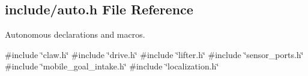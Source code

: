 \subsection{include/auto.h File Reference}
\label{auto_8h}


Autonomous declarations and macros.  


{\ttfamily \#include \char`\"{}claw.\+h\char`\"{}}\newline
{\ttfamily \#include \char`\"{}drive.\+h\char`\"{}}\newline
{\ttfamily \#include \char`\"{}lifter.\+h\char`\"{}}\newline
{\ttfamily \#include \char`\"{}sensor\+\_\+ports.\+h\char`\"{}}\newline
{\ttfamily \#include \char`\"{}mobile\+\_\+goal\+\_\+intake.\+h\char`\"{}}\newline
{\ttfamily \#include \char`\"{}localization.\+h\char`\"{}}\newline
